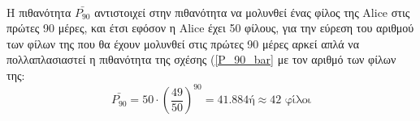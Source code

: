 \noindent\\
Η πιθανότητα $\bar{P_{90}}$ αντιστοιχεί στην πιθανότητα να μολυνθεί ένας φίλος της Alice στις πρώτες 90 μέρες, και έτσι εφόσον η Alice έχει 50 φίλους, για την εύρεση του αριθμού των φίλων της που θα έχουν μολυνθεί στις πρώτες 90 μέρες αρκεί απλά να πολλαπλασιαστεί η πιθανότητα της σχέσης (\ref{P_90_bar} με τον αριθμό των φίλων της:
\begin{equation}
	\bar{P_{90}}= 50 \cdot \left(\frac{49}{50} \right)^{90} = 41.884 ή \approx 42 \text{ φίλοι} \label{P_90_bar_50}
\end{equation}